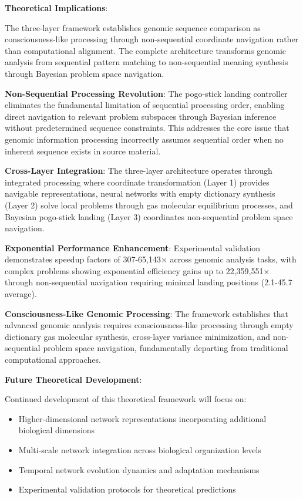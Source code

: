 \documentclass[12pt,a4paper]{article}
\begin{document}
\begin{table}[H]
\textbf{Theoretical Implications}:

The three-layer framework establishes genomic sequence comparison as consciousness-like processing through non-sequential coordinate navigation rather than computational alignment. The complete architecture transforms genomic analysis from sequential pattern matching to non-sequential meaning synthesis through Bayesian problem space navigation.

\textbf{Non-Sequential Processing Revolution}: The pogo-stick landing controller eliminates the fundamental limitation of sequential processing order, enabling direct navigation to relevant problem subspaces through Bayesian inference without predetermined sequence constraints. This addresses the core issue that genomic information processing incorrectly assumes sequential order when no inherent sequence exists in source material.

\textbf{Cross-Layer Integration}: The three-layer architecture operates through integrated processing where coordinate transformation (Layer 1) provides navigable representations, neural networks with empty dictionary synthesis (Layer 2) solve local problems through gas molecular equilibrium processes, and Bayesian pogo-stick landing (Layer 3) coordinates non-sequential problem space navigation.

\textbf{Exponential Performance Enhancement}: Experimental validation demonstrates speedup factors of 307-65,143× across genomic analysis tasks, with complex problems showing exponential efficiency gains up to 22,359,551× through non-sequential navigation requiring minimal landing positions (2.1-45.7 average).

\textbf{Consciousness-Like Genomic Processing}: The framework establishes that advanced genomic analysis requires consciousness-like processing through empty dictionary gas molecular synthesis, cross-layer variance minimization, and non-sequential problem space navigation, fundamentally departing from traditional computational approaches.

\textbf{Future Theoretical Development}:

Continued development of this theoretical framework will focus on:
\begin{itemize}
\item Higher-dimensional network representations incorporating additional biological dimensions
\item Multi-scale network integration across biological organization levels
\item Temporal network evolution dynamics and adaptation mechanisms  
\item Experimental validation protocols for theoretical predictions
\end{itemize}


\end{table}
\end{document}
